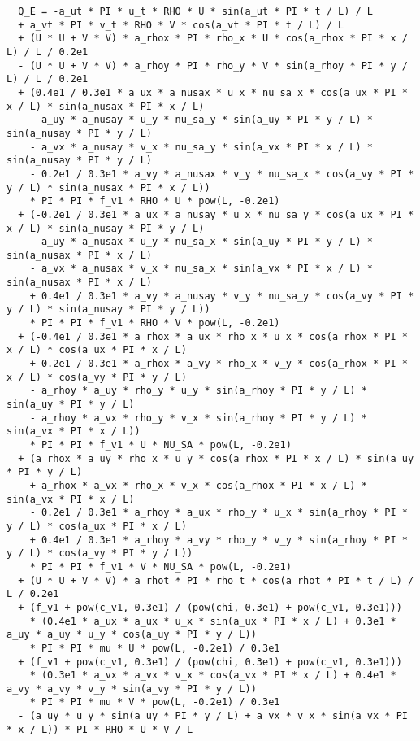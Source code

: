 \documentclass[10pt]{article}
\begin{document}
\begin{footnotesize}
\begin{verbatim}
  Q_E = -a_ut * PI * u_t * RHO * U * sin(a_ut * PI * t / L) / L
  + a_vt * PI * v_t * RHO * V * cos(a_vt * PI * t / L) / L
  + (U * U + V * V) * a_rhox * PI * rho_x * U * cos(a_rhox * PI * x / L) / L / 0.2e1
  - (U * U + V * V) * a_rhoy * PI * rho_y * V * sin(a_rhoy * PI * y / L) / L / 0.2e1
  + (0.4e1 / 0.3e1 * a_ux * a_nusax * u_x * nu_sa_x * cos(a_ux * PI * x / L) * sin(a_nusax * PI * x / L)
    - a_uy * a_nusay * u_y * nu_sa_y * sin(a_uy * PI * y / L) * sin(a_nusay * PI * y / L)
    - a_vx * a_nusay * v_x * nu_sa_y * sin(a_vx * PI * x / L) * sin(a_nusay * PI * y / L)
    - 0.2e1 / 0.3e1 * a_vy * a_nusax * v_y * nu_sa_x * cos(a_vy * PI * y / L) * sin(a_nusax * PI * x / L))
    * PI * PI * f_v1 * RHO * U * pow(L, -0.2e1)
  + (-0.2e1 / 0.3e1 * a_ux * a_nusay * u_x * nu_sa_y * cos(a_ux * PI * x / L) * sin(a_nusay * PI * y / L)
    - a_uy * a_nusax * u_y * nu_sa_x * sin(a_uy * PI * y / L) * sin(a_nusax * PI * x / L)
    - a_vx * a_nusax * v_x * nu_sa_x * sin(a_vx * PI * x / L) * sin(a_nusax * PI * x / L)
    + 0.4e1 / 0.3e1 * a_vy * a_nusay * v_y * nu_sa_y * cos(a_vy * PI * y / L) * sin(a_nusay * PI * y / L))
    * PI * PI * f_v1 * RHO * V * pow(L, -0.2e1)
  + (-0.4e1 / 0.3e1 * a_rhox * a_ux * rho_x * u_x * cos(a_rhox * PI * x / L) * cos(a_ux * PI * x / L)
    + 0.2e1 / 0.3e1 * a_rhox * a_vy * rho_x * v_y * cos(a_rhox * PI * x / L) * cos(a_vy * PI * y / L)
    - a_rhoy * a_uy * rho_y * u_y * sin(a_rhoy * PI * y / L) * sin(a_uy * PI * y / L)
    - a_rhoy * a_vx * rho_y * v_x * sin(a_rhoy * PI * y / L) * sin(a_vx * PI * x / L))
    * PI * PI * f_v1 * U * NU_SA * pow(L, -0.2e1)
  + (a_rhox * a_uy * rho_x * u_y * cos(a_rhox * PI * x / L) * sin(a_uy * PI * y / L)
    + a_rhox * a_vx * rho_x * v_x * cos(a_rhox * PI * x / L) * sin(a_vx * PI * x / L)
    - 0.2e1 / 0.3e1 * a_rhoy * a_ux * rho_y * u_x * sin(a_rhoy * PI * y / L) * cos(a_ux * PI * x / L)
    + 0.4e1 / 0.3e1 * a_rhoy * a_vy * rho_y * v_y * sin(a_rhoy * PI * y / L) * cos(a_vy * PI * y / L))
    * PI * PI * f_v1 * V * NU_SA * pow(L, -0.2e1)
  + (U * U + V * V) * a_rhot * PI * rho_t * cos(a_rhot * PI * t / L) / L / 0.2e1
  + (f_v1 + pow(c_v1, 0.3e1) / (pow(chi, 0.3e1) + pow(c_v1, 0.3e1)))
    * (0.4e1 * a_ux * a_ux * u_x * sin(a_ux * PI * x / L) + 0.3e1 * a_uy * a_uy * u_y * cos(a_uy * PI * y / L))
    * PI * PI * mu * U * pow(L, -0.2e1) / 0.3e1
  + (f_v1 + pow(c_v1, 0.3e1) / (pow(chi, 0.3e1) + pow(c_v1, 0.3e1)))
    * (0.3e1 * a_vx * a_vx * v_x * cos(a_vx * PI * x / L) + 0.4e1 * a_vy * a_vy * v_y * sin(a_vy * PI * y / L))
    * PI * PI * mu * V * pow(L, -0.2e1) / 0.3e1
  - (a_uy * u_y * sin(a_uy * PI * y / L) + a_vx * v_x * sin(a_vx * PI * x / L)) * PI * RHO * U * V / L

\end{verbatim}
\end{footnotesize}
\end{document}
